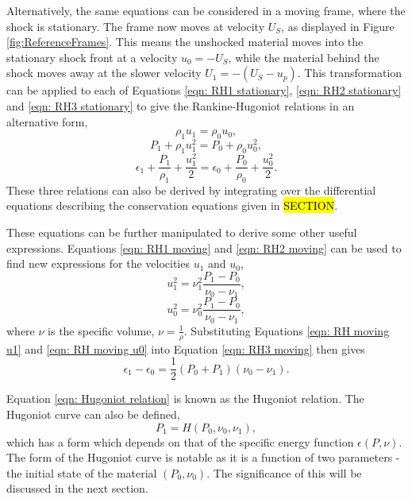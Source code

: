 Alternatively, the same equations can be considered in a moving frame, where the shock is stationary. The frame now moves at velocity $U_S$, as displayed in Figure \ref{fig:ReferenceFrames}. This means the unshocked material moves into the stationary shock front at a velocity $u_0 = -U_S$, while the material behind the shock moves away at the slower velocity $U_1 = -(U_S - u_p)$. This transformation can be applied to each of Equations \ref{eqn: RH1 stationary}, \ref{eqn: RH2 stationary} and \ref{eqn: RH3 stationary} to give the Rankine-Hugoniot relations in an alternative form,
\begin{equation} \rho_1 u_1 = \rho_0 u_0, \label{eqn: RH1 moving} \end{equation}
\begin{equation} P_1 + \rho_1 u_1^2 = P_0 + \rho_0 u_0^2, \label{eqn: RH2 moving} \end{equation}
\begin{equation} \epsilon_1 + \frac{P_1}{\rho_1} + \frac{u_1^2}{2} = \epsilon_0 + \frac{P_0}{\rho_0} + \frac{u_0^2}{2}. \label{eqn: RH3 moving} \end{equation}
These three relations can also be derived by integrating over the differential equations describing the conservation equations given in \hl{SECTION}.

These equations can be further manipulated to derive some other useful expressions. Equations \ref{eqn: RH1 moving} and \ref{eqn: RH2 moving} can be used to find new expressions for the velocities $u_1$ and $u_0$, 
\begin{equation} u_1^2 = \nu_1^2 \frac{P_1 - P_0}{\nu_0 - \nu_1}, \label{eqn: RH moving u1} \end{equation}
\begin{equation} u_0^2 = \nu_0^2 \frac{P_1 - P_0}{\nu_0 - \nu_1}, \label{eqn: RH moving u0} \end{equation}
where $\nu$ is the specific volume, $\nu = \frac{1}{\rho}$. Substituting Equations \ref{eqn: RH moving u1} and \ref{eqn: RH moving u0} into Equation \ref{eqn: RH3 moving} then gives
\begin{equation} \epsilon_1 - \epsilon_0 = \frac{1}{2}(P_0 + P_1)(\nu_0 - \nu_1).\label{eqn: Hugoniot relation} \end{equation}

Equation \ref{eqn: Hugoniot relation} is known as the Hugoniot relation. The Hugoniot curve can also be defined, 
\begin{equation} P_1 = H(P_0, \nu_0, \nu_1), \end{equation}
which has a form which depends on that of the specific energy function $\epsilon(P, \nu)$. The form of the Hugoniot curve is notable as it is a function of two parameters - the initial state of the material $(P_0, \nu_0)$. The significance of this will be discussed in the next section.


